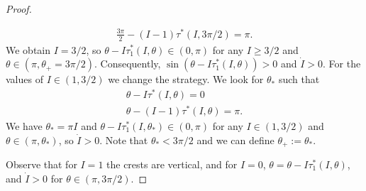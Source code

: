 \documentclass[a4paper,10pt]{article}
\newcommand{\zerom}{\text{1}}
\theoremstyle{definition}
\begin{document}
\begin{proof}
\begin{itemize}
\begin{eqnarray*}
\frac{3\pi}{2} - (I - 1)\tau^*(I,3\pi/2) = \pi.
\end{eqnarray*}
We obtain $I = 3/2$, so  $\theta - I\tau^*_{\zerom}(I,\theta) \in (0,\pi)$ for any $I \geq 3/2$ and $\theta \in (\pi , \theta_+ = 3\pi/2)$.
Consequently, $\sin(\theta - I\tau^*_{\zerom}(I,\theta))>0$ and $\dot{I}>0$.
For the values of $I\in(1,3/2)$ we change the strategy.
We look for $\theta_*$ such that
\begin{eqnarray*}
\theta - I\tau^*(I,\theta) = 0\\
\theta - (I-1)\tau^*(I,\theta) = \pi.
\end{eqnarray*}
We have $\theta_* = \pi I$ and $\theta - I\tau^*_{\zerom}(I,\theta_*)\in(0,\pi)$ for any $I\in(1,3/2)$ and $\theta\in(\pi, \theta_*)$, so $\dot{I}>0$.
Note that $\theta_* < 3\pi/2$ and we can define $\theta_+ := \theta_*$.
\end{itemize}
Observe that for $I = 1 $ the crests are vertical, and for $I=0$, $\theta = \theta - I\tau^*_{\zerom}(I,\theta)$, and $\dot{I}>0$ for $\theta \in (\pi,3\pi/2)$.


\end{proof}
\end{document}
